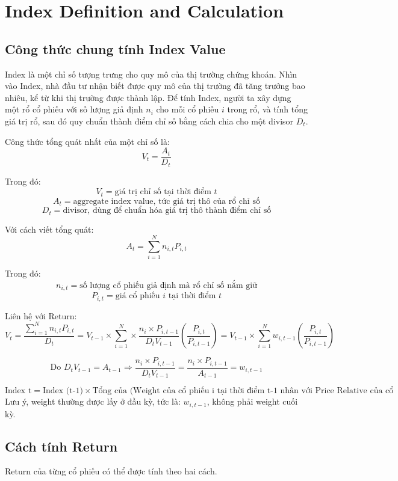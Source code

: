 \chapter{Index Definition and Calculation}
\label{chap:Index Definition and Calculation}

\section{Công thức chung tính Index Value}
\label{sec:app_index_general_formula}
Index là một chỉ số tượng trưng cho quy mô của thị trường chứng khoán.
Nhìn vào Index, nhà đầu tư nhận biết được quy mô của thị trường đã tăng trưởng bao nhiêu, kể từ khi thị trường được thành lập.
Để tính Index, người ta xây dựng một rổ cổ phiếu với số lượng giả định \(n_i\) cho mỗi cổ phiếu \(i\) trong rổ, và tính tổng giá trị rổ, sau đó quy chuẩn thành điểm chỉ số bằng cách chia cho một divisor $D_t$.

Công thức tổng quát nhất của một chỉ số là:
\[
V_t = \frac{A_t}{D_t}
\]

Trong đó:
\[
V_t = \text{giá trị chỉ số tại thời điểm } t
\]
\[
A_t = \text{aggregate index value, tức giá trị thô của rổ chỉ số}
\]
\[
D_t = \text{divisor, dùng để chuẩn hóa giá trị thô thành điểm chỉ số}
\]

Với cách viết tổng quát:
\[
A_t = \sum_{i=1}^{N} n_{i,t}P_{i,t}
\]

Trong đó:
\[
n_{i,t} = \text{số lượng cổ phiếu giả định mà rổ chỉ số nắm giữ}
\]
\[
P_{i,t} = \text{giá cổ phiếu } i \text{ tại thời điểm } t
\]

Liên hệ với Return:
\[
V_t = \frac{\sum_{i=1}^{N} n_{i,t}P_{i,t}}{D_t}
= V_{t-1}\times\sum_{i=1}^{N} \times \frac{n_i \times P_{i,t-1}}{D_t V_{t-1}}\left(\frac{P_{i,t}}{P_{i,t-1}}\right)
= V_{t-1}\times\sum_{i=1}^{N}w_{i,t-1}\left(\frac{P_{i,t}}{P_{i,t-1}}\right)
\]

\[
\text{Do } D_t V_{t-1} = A_{t-1} \Rightarrow \frac{n_i \times P_{i,t-1}}{D_t V_{t-1}} = \frac{n_i \times P_{i,t-1}}{A_{t-1}} = w_{i,t-1}
\]

\[
\text{Index t} = \text{Index (t-1)} \times \text{Tổng của (Weight của cổ phiếu i tại thời điểm t-1 nhân với Price Relative của cổ phiếu i)}
\]
Lưu ý, weight thường được lấy ở đầu kỳ, tức là: $w_{i,t-1}$, không phải weight cuối kỳ.
\section{Cách tính Return}
\label{sec:app_index_return}
Return của từng cổ phiếu có thể được tính theo hai cách.
